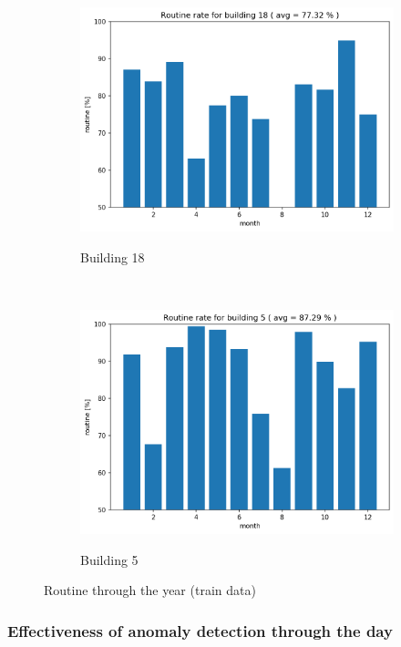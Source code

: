 \begin{figure}[H]
    \begin{subfigure}{.5\textwidth}
		\caption{Building 18}
		\includegraphics[width=1\linewidth]{../Figures/EC/b18year.png}
		\label{fig:ec_b18year}
	\end{subfigure}%
    ~ 
    \begin{subfigure}{.5\textwidth}
		\caption{Building 5}
		\includegraphics[width=1\linewidth]{../Figures/EC/b5year.png}
		\label{fig:ec_b5year}
	\end{subfigure}%
	
	\caption{Routine through the year (train data)}
    \label{fig:ec_year}
\end{figure}

\subsubsection{Effectiveness of anomaly detection through the day}

